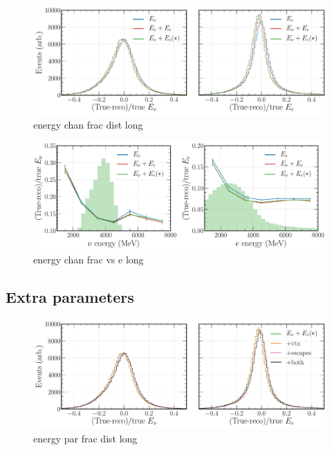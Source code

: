 \begin{figure} %
    \includegraphics[width=\textwidth]{diagrams/7-cvn/chipsnet/energy_chan_frac_dist.pdf}
    \caption[energy chan frac dist short]
    {energy chan frac dist long}
    \label{fig:energy_chan_frac_dist}
\end{figure}

\begin{figure} %
    \includegraphics[width=\textwidth]{diagrams/7-cvn/chipsnet/energy_chan_frac_vs_e.pdf}
    \caption[energy chan frac vs e short]
    {energy chan frac vs e long}
    \label{fig:energy_chan_frac_vs_e}
\end{figure}

\subsection{Extra parameters} %
\label{sec:cvn_energy_par} %

\begin{figure} %
    \includegraphics[width=\textwidth]{diagrams/7-cvn/chipsnet/energy_par_frac_dist.pdf}
    \caption[energy par frac dist short]
    {energy par frac dist long}
    \label{fig:energy_par_frac_dist}
\end{figure}

